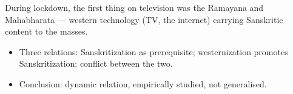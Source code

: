 \begin{ExampleBox}
During lockdown, the first thing on television was the Ramayana and Mahabharata --- western technology (TV, the internet) carrying Sanskritic content to the masses.
\end{ExampleBox}

\begin{QuickRevision}
\begin{itemize}
\item Three relations: Sanskritization as prerequisite; westernization promotes Sanskritization; conflict between the two.
\item Conclusion: dynamic relation, empirically studied, not generalised.
\end{itemize}
\end{QuickRevision}
